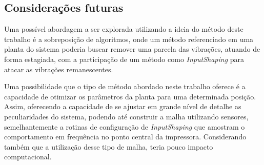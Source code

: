 \subsection{Considerações futuras}
Uma possível abordagem a ser explorada utilizando a ideia do método deste trabalho é a sobreposição de algoritmos, onde
um método referenciado em uma planta do sistema poderia buscar remover uma parcela das vibrações, atuando de forma estagiada,
com a participação de um método como \textit{InputShaping} para atacar as vibrações remanescentes.

Uma possibilidade que o tipo de método abordado neste trabalho oferece é a capacidade de otimizar os parâmetros da planta para uma determinada posição.
Assim, oferecendo a capacidade de se ajustar em grande nível de detalhe as peculiaridades do sistema, podendo até
construir a malha utilizando sensores, semelhantemente a rotinas de configuração de \textit{InputShaping} que amostram
o comportamento em frequência no ponto central da impressora. Considerando também que a utilização desse tipo de malha,
teria pouco impacto computacional.


